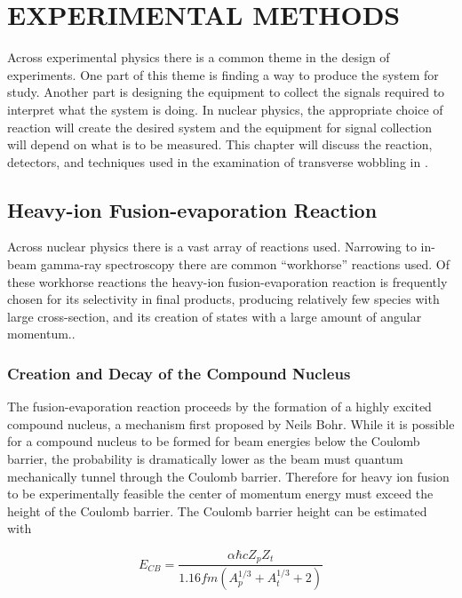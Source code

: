 %
%

\chapter{EXPERIMENTAL METHODS}
\label{chp:exp-pr}
Across experimental physics there is a common theme in the design of experiments. One part of this theme is finding a way to produce the system for study. Another part is designing the equipment to collect the signals required to interpret what the system is doing. In nuclear physics, the appropriate choice of reaction will create the desired system and the equipment for signal collection will depend on what is to be measured. This chapter will discuss the reaction, detectors, and techniques used in the examination of transverse wobbling in \pr{}.
\section{Heavy-ion Fusion-evaporation Reaction}
\label{sec:exp-pr-fus-evap}
Across nuclear physics there is a vast array of reactions used. Narrowing to in-beam gamma-ray spectroscopy there are common ``workhorse'' reactions used. Of these workhorse reactions the heavy-ion fusion-evaporation reaction is frequently chosen for its selectivity in final products, producing relatively few species with large cross-section, and its creation of states with a large amount of angular momentum.\cite{beausang1996arrays}.
\subsection{Creation and Decay of the Compound Nucleus}
\label{ssec:exp-pr-fus-evap-cn}
The fusion-evaporation reaction proceeds by the formation of a highly excited compound nucleus, a mechanism first proposed by Neils Bohr\cite{bohr1936neutron}. While it is possible for a compound nucleus to be formed for beam energies below the Coulomb barrier, the probability is dramatically lower as the beam must quantum mechanically tunnel through the Coulomb barrier. Therefore for heavy ion fusion to be experimentally feasible the center of momentum energy must exceed the height of the Coulomb barrier. The Coulomb barrier height can be estimated with

\begin{equation}
\label{eqn:chp3-cb_en}
E_{CB}=\frac{\alpha \hbar c Z_p Z_t}{1.16 fm (A_p^{1/3} + A_t^{1/3} + 2)}
\end{equation}

